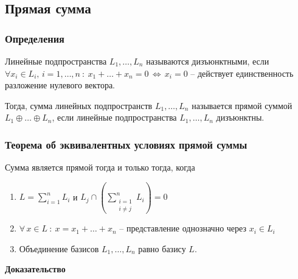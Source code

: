 \documentclass{article}
\begin{document}
\subsection{Прямая сумма}
\subsubsection{Определения}
Линейные подпространства $L_1,\ldots,L_n$ называются дизъюнктными, если $\forall x_i\in L_i, \,i=1,\ldots,n\::\:x_1+\ldots+x_n=0\,\Leftrightarrow\,x_i=0$ -- действует единственность разложение нулевого вектора.

Тогда, сумма линейных подпространств $L_1,\ldots,L_n$ называется прямой суммой $L_1\oplus\ldots\oplus L_n$, если линейные подпространства $L_1,\ldots,L_n$ дизъюнктны.

\subsubsection{Теорема об эквивалентных условиях прямой суммы}
Сумма является прямой тогда и только тогда, когда 
\begin{enumerate}
    \item $L=\sum\limits_{i=1}^n L_i$  и $L_j\cap(\sum\limits_{\substack{i=1\\i\neq j}}^n L_i)=0$
    \item $\forall\,x\in L\::\:x=x_1+\ldots+x_n$ -- представление однозначно через $x_i\in L_i$
    \item Объединение базисов $L_1,\ldots,L_n$ равно базису $L$.
\end{enumerate}
\textbf{Доказательство}
\end{document}
